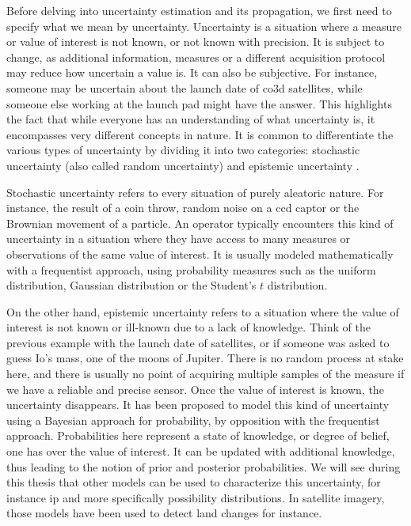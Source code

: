 Before delving into uncertainty estimation and its propagation, we first need to specify what we mean by uncertainty. Uncertainty is a situation where a measure or value of interest is not known, or not known with precision. It is subject to change, as additional information, measures or a different acquisition protocol may reduce how uncertain a value is. It can also be subjective. For instance, someone may be uncertain about the launch date of \acrshort{co3d} satellites, while someone else working at the launch pad might have the answer. This highlights the fact that while everyone has an understanding of what uncertainty is, it encompasses very different concepts in nature. It is common to differentiate the various types of uncertainty by dividing it into two categories: stochastic uncertainty (also called random uncertainty) and epistemic uncertainty \cite{hora_aleatory_1996,frank_treatment_1999}.

Stochastic uncertainty refers to every situation of purely aleatoric nature. For instance, the result of a coin throw, random noise on a \acrshort{ccd} captor or the Brownian movement of a particle. An operator typically encounters this kind of uncertainty in a situation where they have access to many measures or observations of the same value of interest. It is usually modeled mathematically with a frequentist approach, using probability measures such as the uniform distribution, Gaussian distribution or the Student's $t$ distribution.

On the other hand, epistemic uncertainty refers to a situation where the value of interest is not known or ill-known due to a lack of knowledge. Think of the previous example with the launch date of satellites, or if someone was asked to guess Io's mass, one of the moons of Jupiter. There is no random process at stake here, and there is usually no point of acquiring multiple samples of the measure if we have a reliable and precise sensor. Once the value of interest is known, the uncertainty disappears. It has been proposed to model this kind of uncertainty using a Bayesian approach for probability, by opposition with the frequentist approach. Probabilities here represent a state of knowledge, or degree of belief, one has over the value of interest. It can be updated with additional knowledge, thus leading to the notion of prior and posterior probabilities. We will see during this thesis that other models can be used to characterize this uncertainty, for instance \acrfull{ip} and more specifically possibility distributions. In satellite imagery, those models have been used to detect land changes \cite{lesniewska-choquet_specialite_2020} for instance.

